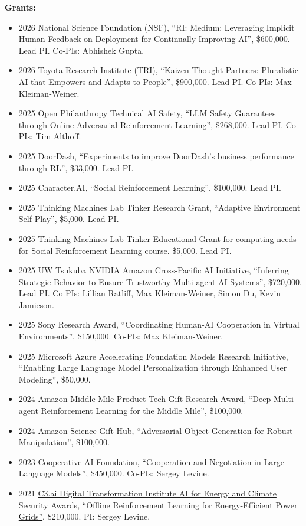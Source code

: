 \documentclass[paper=letter,fontsize=11pt]{scrartcl} %
\begin{document}
\noindent \textbf{Grants:}
\begin{itemize}
\item 2026 National Science Foundation (NSF), ``RI: Medium: Leveraging Implicit Human Feedback on Deployment for Continually Improving AI'', \$600,000. Lead PI. Co-PIs: Abhishek Gupta.

\item 2026 Toyota Research Institute (TRI), ``Kaizen Thought Partners: Pluralistic AI that Empowers and Adapts to People'', \$900,000. Lead PI. Co-PIs: Max Kleiman-Weiner.

\item 2025 Open Philanthropy Technical AI Safety, ``LLM Safety Guarantees through Online Adversarial Reinforcement Learning'', \$268,000. Lead PI. Co-PIs: Tim Althoff.

\item 2025 DoorDash, ``Experiments to improve DoorDash's business performance through RL'', \$33,000. Lead PI.

\item 2025 Character.AI, ``Social Reinforcement Learning'', \$100,000. Lead PI.

\item 2025 Thinking Machines Lab Tinker Research Grant, ``Adaptive Environment Self-Play'', \$5,000. Lead PI.

\item 2025 Thinking Machines Lab Tinker Educational Grant for computing needs for Social Reinforcement Learning course. \$5,000. Lead PI.

\item 2025 UW Tsukuba NVIDIA Amazon Cross-Pacific AI Initiative, “Inferring Strategic Behavior to Ensure Trustworthy Multi-agent AI Systems”, \$720,000. Lead PI. Co PIs: Lillian Ratliff, Max Kleiman-Weiner, Simon Du, Kevin Jamieson.%
\item 2025 Sony Research Award, “Coordinating Human-AI Cooperation in Virtual Environments”, \$150,000. Co-PIs: Max Kleiman-Weiner. %
\item 2025 Microsoft Azure Accelerating Foundation Models Research Initiative, “Enabling Large Language Model Personalization through Enhanced User Modeling”, \$50,000.
\item 2024 Amazon Middle Mile Product Tech Gift Research Award, “Deep Multi-agent Reinforcement Learning for the Middle Mile”, \$100,000. %
\item 2024 Amazon Science Gift Hub, “Adversarial Object Generation for Robust Manipulation”, \$100,000. %
\item 2023 Cooperative AI Foundation, “Cooperation and Negotiation in Large Language Models”, \$450,000. Co-PIs: Sergey Levine.%
\item 2021 \href{}{C3.ai Digital Transformation Institute AI for Energy and Climate Security Awards}, \href{}{“Offline Reinforcement Learning for Energy-Efficient Power Grids”}, \$210,000. PI: Sergey Levine. %
\end{itemize}
\end{document}
